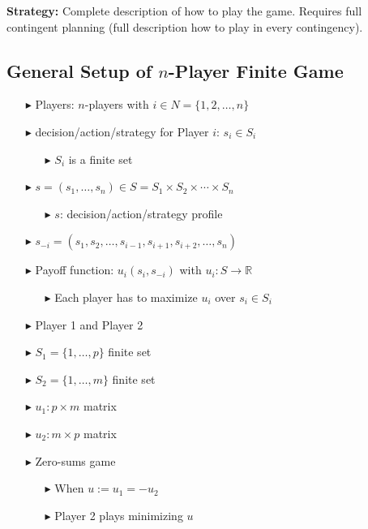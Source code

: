 \documentclass[../Main.tex]{subfiles}
\begin{document}
\textbf{Strategy:} Complete description of how to play the game. Requires full contingent planning (full description how to play in every contingency).

\subsection*{General Setup of $n$-Player Finite Game}

\begin{itemize}
    \item[$\blacktriangleright$] Players: $n$-players with $i \in N = \{1, 2, \ldots, n\}$
    \item[$\blacktriangleright$] decision/action/strategy for Player $i$: $s_i \in S_i$
    \begin{itemize}
        \item[$\blacktriangleright$] $S_i$ is a finite set
    \end{itemize}
    \item[$\blacktriangleright$] $s = (s_1, \ldots, s_n) \in S = S_1 \times S_2 \times \cdots \times S_n$
    \begin{itemize}
        \item[$\blacktriangleright$] $s$: decision/action/strategy profile
    \end{itemize}
    \item[$\blacktriangleright$] $s_{-i} = (s_1, s_2, \ldots, s_{i-1}, s_{i+1}, s_{i+2}, \ldots, s_n)$
    \item[$\blacktriangleright$] Payoff function: $u_i(s_i, s_{-i})$ with $u_i : S \to \mathbb{R}$
    \begin{itemize}
        \item[$\blacktriangleright$] Each player has to maximize $u_i$ over $s_i \in S_i$
    \end{itemize}
\end{itemize}

\begin{itemize}
    \item[$\blacktriangleright$] Player 1 and Player 2
    \item[$\blacktriangleright$] $S_1 = \{1, \ldots, p\}$ finite set
    \item[$\blacktriangleright$] $S_2 = \{1, \ldots, m\}$ finite set
    \item[$\blacktriangleright$] $u_1: p \times m$ matrix
    \item[$\blacktriangleright$] $u_2: m \times p$ matrix
    \item[$\blacktriangleright$] Zero-sums game
    \begin{itemize}
        \item[$\blacktriangleright$] When $u := u_1 = -u_2$
        \item[$\blacktriangleright$] Player 2 plays minimizing $u$
    \end{itemize}
\end{itemize}
\end{document}
